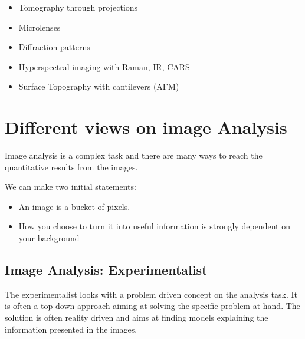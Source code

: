 \documentclass[letterpaper,10pt,english]{sphinxmanual}
\begin{document}
\begin{itemize}
\item {} 
\sphinxAtStartPar
Tomography through projections

\item {} 
\sphinxAtStartPar
Microlenses 

\end{itemize}


\begin{itemize}
\item {} 
\sphinxAtStartPar
Diffraction patterns

\item {} 
\sphinxAtStartPar
Hyperspectral imaging with Raman, IR, CARS

\item {} 
\sphinxAtStartPar
Surface Topography with cantilevers (AFM)

\end{itemize}




\chapter{Different views on image Analysis}
\label{\detokenize{01-Introduction:different-views-on-image-analysis}}
\sphinxAtStartPar
Image analysis is a complex task and there are many ways to reach the quantitative results from the images.

\sphinxAtStartPar
We can make two initial statements:


\begin{itemize}
\item {} 
\sphinxAtStartPar
An image is a bucket of pixels.

\item {} 
\sphinxAtStartPar
How you choose to turn it into useful information is strongly dependent on your background

\end{itemize}


\section{Image Analysis: Experimentalist}
\label{\detokenize{01-Introduction:image-analysis-experimentalist}}
\sphinxAtStartPar
The experimentalist looks with a problem driven concept on the analysis task. It is often a top down approach aiming at solving the specific problem at hand. The solution is often reality driven and aims at finding models explaining the information presented in the images.
\end{document}
